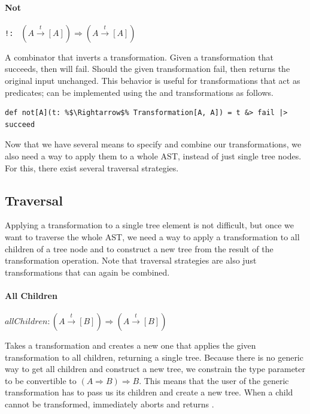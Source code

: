 \paragraph{Not} \hfill \lstinline{!: } $(A \overset{t}{\rightarrow} [A]) \Rightarrow (A \overset{t}{\rightarrow} [A])$

\vspace{7pt} A combinator that inverts a transformation. Given a transformation that succeeds, then  will fail. Should the given transformation fail, then  returns the original input unchanged. This behavior is useful for transformations that act as predicates;  can be implemented using the  and  transformations as follows.

\begin{lstlisting}
def not[A](t: %$\Rightarrow$% Transformation[A, A]) = t &> fail |> succeed
\end{lstlisting}

Now that we have several means to specify and combine our transformations, we also need a way to apply them to a whole AST, instead of just single tree nodes. For this, there exist several traversal strategies.

\subsection{Traversal}

Applying a transformation to a single tree element is not difficult, but once we want to traverse the whole AST, we need a way to apply a transformation to all children of a tree node and to construct a new tree from the result of the transformation operation. Note that traversal strategies are also just transformations that can again be combined.

\paragraph{All Children} \hfill  $allChildren: (A \overset{t}{\rightarrow} [B]) \Rightarrow (A \overset{t}{\rightarrow} [B])$

\vspace{7pt} Takes a transformation and creates a new one that applies the given transformation to all children, returning a single tree. Because there is no generic way to get all children and construct a new tree, we constrain the type parameter  to be convertible to $(A \Rightarrow B) \Rightarrow B$. This means that the user of the generic transformation has to pass us its children and create a new tree. When a child cannot be transformed,  immediately aborts and returns .


